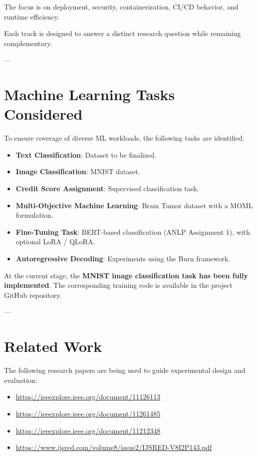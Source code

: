 \documentclass[11pt,a4paper]{article}
\begin{document}
The focus is on deployment, security, containerization, CI/CD behavior, and runtime efficiency.

Each track is designed to answer a distinct research question while remaining complementary.

---

\section{Machine Learning Tasks Considered}

To ensure coverage of diverse ML workloads, the following tasks are identified:

\begin{itemize}
    \item \textbf{Text Classification}: Dataset to be finalized.
    \item \textbf{Image Classification}: MNIST dataset.
    \item \textbf{Credit Score Assignment}: Supervised classification task.
    \item \textbf{Multi-Objective Machine Learning}: Brain Tumor dataset with a MOML formulation.
    \item \textbf{Fine-Tuning Task}: BERT-based classification (ANLP Assignment 1), with optional LoRA / QLoRA.
    \item \textbf{Autoregressive Decoding}: Experiments using the Burn framework.
\end{itemize}

At the current stage, the \textbf{MNIST image classification task has been fully implemented}.  
The corresponding training code is available in the project GitHub repository.

---

\section{Related Work}

The following research papers are being used to guide experimental design and evaluation:

\begin{itemize}
    \item \url{https://ieeexplore.ieee.org/document/11126113}
    \item \url{https://ieeexplore.ieee.org/document/11261485}
    \item \url{https://ieeexplore.ieee.org/document/11212348}
    \item \url{https://www.ijsred.com/volume8/issue2/IJSRED-V8I2P143.pdf}
\end{itemize}
\end{document}
